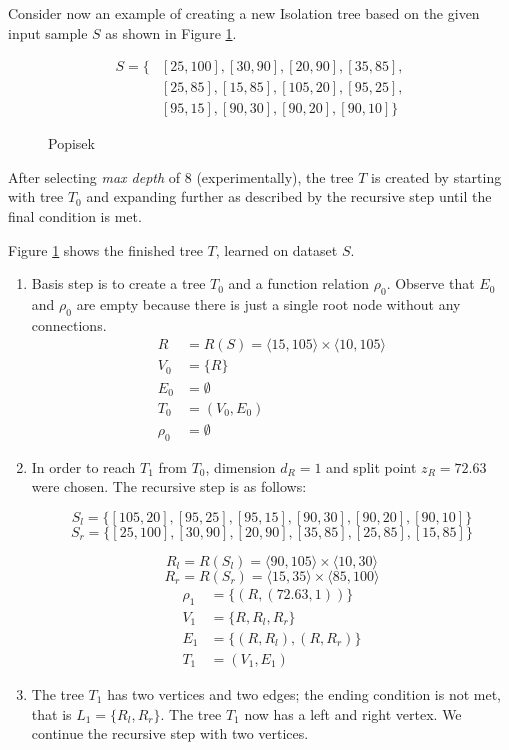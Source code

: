 \begin{example}
\label{example:original_tree_create}
Consider now an example of creating a new Isolation tree based on the given input sample $S$ as shown in Figure \ref{fig:example_noutlier_gnu}.

\begin{align*}
    S = \{&[25,100],[30,90],[20,90],[35,85],\\
    &[25,85],[15,85],[105,20],[95,25], \\
    &[95,15],[90,30],[90,20],[90,10]\}
\end{align*}


\begin{figure}[htbp]
\centering

\caption{Popisek}
\label{fig:example_noutlier_gnu}
\end{figure}

After selecting \emph{max depth} of 8 (experimentally), the tree $T$ is created by starting with tree $T_0$ and expanding further as described by the recursive step until the final condition is met.

Figure \ref{fig:example_noutlier_gnu} shows the finished tree $T$, learned on dataset $S$.

\begin{enumerate}
    \item Basis step is to create a tree $T_0$ and a function relation $\rho_0$. 
    Observe that $E_0$ and $\rho_0$ are empty because there is just a single root node without any connections.
\begin{align*}
R &= R(S) = \langle 15, 105 \rangle \times \langle 10, 105 \rangle\\
V_0 &= \{R\}\\
E_0 &= \emptyset\\
T_0 &= (V_0, E_0)\\
\rho_0 &= \emptyset
\end{align*}    

\item In order to reach $T_1$ from $T_0$, dimension $d_R=1$ and split point $z_R = 72.63$ were chosen. The recursive step is as follows:

$$S_l = \{[105,20],[95,25],[95,15],[90,30],[90,20],[90,10]\}$$
$$S_r = \{[25,100],[30,90],[20,90],[35,85],[25,85],[15,85]\}$$

$$R_l = R(S_l) = \langle 90, 105 \rangle \times \langle 10, 30 \rangle$$
$$R_r = R(S_r) = \langle 15, 35 \rangle \times \langle 85, 100 \rangle$$
\begin{align*}
\rho_1 &= \{ (R, (72.63, 1))\}\\
V_1 &= \{R, R_l, R_r\}\\
E_1 &= \{(R,R_l), (R,R_r)\}\\
T_1 &= (V_1, E_1)
\end{align*}
\item The tree $T_1$ has two vertices and two edges; the ending condition is not met, that is $L_1 = \{R_l,R_r\}$. The tree $T_1$ now has a left and right vertex. We continue the recursive step with two vertices.


\end{enumerate}
\end{example}
